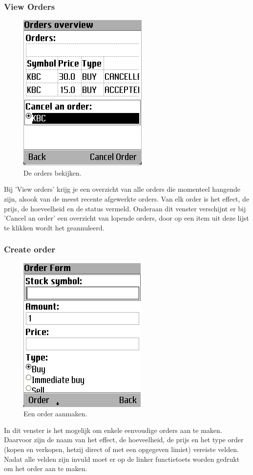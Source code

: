 \subsubsection{View Orders}
\begin{figure}[h!]
	\centering
		\includegraphics[scale=0.75]{images/handleiding/mobile/Orders}
	\caption{De orders bekijken.}
	\label{fig:handl:mobile:orders}
\end{figure}
Bij 'View orders' krijg je een overzicht van alle orders die momenteel hangende zijn, alsook van de meest recente afgewerkte orders. Van elk order is het effect, de prijs, de hoeveelheid en de status vermeld.
Onderaan dit venster verschijnt er bij 'Cancel an order' een overzicht van lopende orders, door op een item uit deze lijst te klikken wordt het geannuleerd.

\subsubsection{Create order}
\begin{figure}[h!]
	\centering
		\includegraphics[scale=0.75]{images/handleiding/mobile/CreateOrder}
	\caption{Een order aanmaken.}
	\label{fig:handl:mobile:createorder}
\end{figure}
In dit venster is het mogelijk om enkele eenvoudige orders aan te maken. Daarvoor zijn de naam van het effect, de hoeveelheid, de prijs en het type order (kopen en verkopen, hetzij direct of met een opgegeven limiet) vereiste velden. Nadat alle velden zijn invuld moet er op de linker functietoets worden gedrukt om het order aan te maken.

